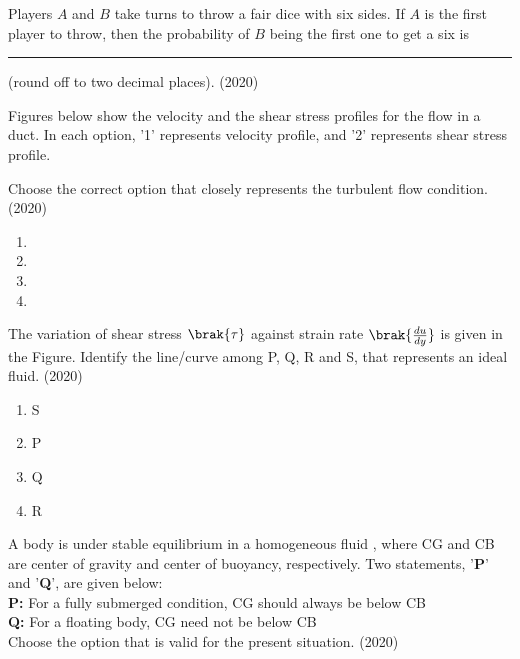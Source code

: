     
    \item Players $A$ and $B$ take turns to throw a fair dice with six sides. If $A$ is the first player to throw, then the probability of $B$ being the first one to get a six is \rule{1cm}{0.15mm} (round off to two decimal places).
    \hfill{(2020)}

        
    \item Figures below show the velocity and the shear stress profiles for the flow in a duct. In each option, '1' represents velocity profile, and '2' represents shear stress profile.

    Choose the correct option that closely represents the turbulent flow condition.
    \hfill{(2020)}

    \begin{multicols}{2}
        \begin{enumerate}
            \item 
            \item 
            \item 
            \item 
        \end{enumerate}
    \end{multicols}

    
    \item The variation of shear stress $\brak{\tau}$ against strain rate $\brak{\frac{du}{dy}}$ is given in the Figure. Identify the line/curve among P, Q, R and S, that represents an ideal fluid.
    \hfill{(2020)}

    

    \begin{multicols}{4}
        \begin{enumerate}
            \item S
            \item P
            \item Q
            \item R
        \end{enumerate}
    \end{multicols}

    
    \item A body is under stable equilibrium in a homogeneous fluid , where CG and CB are center of gravity and center of buoyancy, respectively. Two statements, '\textbf{P}' and '\textbf{Q}', are given below:\\
    \textbf{P:} For a fully submerged condition, CG should always be below CB\\
    \textbf{Q:} For a floating body, CG need not be below CB\\
    Choose the option that is valid for the present situation.
    \hfill{(2020)}


